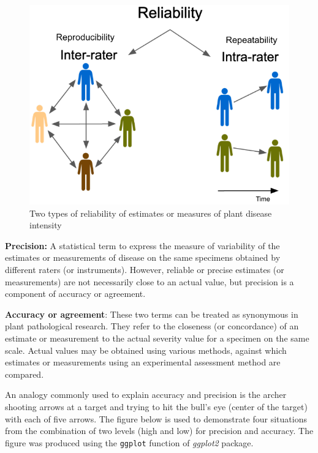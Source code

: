 \documentclass[
  letterpaper,
]{book}
\begin{document}
\begin{figure}

{\centering \includegraphics[width=5.26042in,height=\textheight]{imgs/reliability.png}

}

\caption{\label{fig-reliability.png}Two types of reliability of
estimates or measures of plant disease intensity}

\end{figure}

\textbf{Precision:} A statistical term to express the measure of
variability of the estimates or measurements of disease on the same
specimens obtained by different raters (or instruments). However,
reliable or precise estimates (or measurements) are not necessarily
close to an actual value, but precision is a component of accuracy or
agreement.

\textbf{Accuracy or agreement}: These two terms can be treated as
synonymous in plant pathological research. They refer to the closeness
(or concordance) of an estimate or measurement to the actual severity
value for a specimen on the same scale. Actual values may be obtained
using various methods, against which estimates or measurements using an
experimental assessment method are compared.

An analogy commonly used to explain accuracy and precision is the archer
shooting arrows at a target and trying to hit the bull's eye (center of
the target) with each of five arrows. The figure below is used to
demonstrate four situations from the combination of two levels (high and
low) for precision and accuracy. The figure was produced using the
\texttt{ggplot} function of \emph{ggplot2} package.
\end{document}
